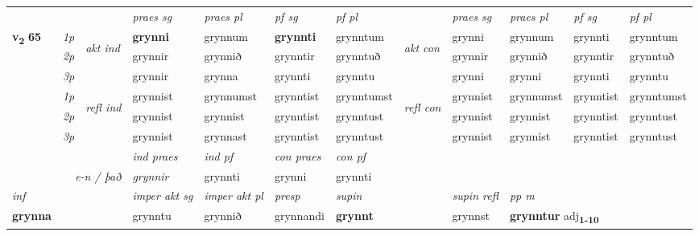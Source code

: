 \begin{longtable}[l]{X>{\footnotesize\itshape}llXXXXlXXXX}
 & &   & \textit{praes sg}  & \textit{praes pl}    & \textit{ pf sg} & \textit{pf pl} & & \textit{praes sg}  & \textit{praes pl}    & \textit{pf sg} & \textit{pf pl }  \\ \cmidrule{4-7} \cmidrule{9-12}
 \multirow{2}{*}{{{\textbf{v{\textsubscript{2}}} \Large{\textbf{65}}}}}  & 1p & \multirow{3}{*}{\begin{turn}{90}\textit{akt ind}\end{turn}} & \textbf{grynni} & grynnum & \textbf{grynnti} & grynntum & \multirow{3}{*}{\begin{turn}{90}\textit{akt con}\end{turn}} &grynni & grynnum & grynnti & grynntum\\*
 & 2p &  &  grynnir  & grynnið & grynntir & grynntuð & & grynnir & grynnið & grynntir & grynntuð \\*
 & 3p &  & grynnir & grynna & grynnti & grynntu & & grynni & grynni& grynnti & grynntu \\*
\cmidrule{4-7} \cmidrule{9-12}
 & 1p & \multirow{3}{*}{\begin{turn}{90}\textit{refl ind}\end{turn}}  & grynnist & grynnumst & grynntist & grynntumst & \multirow{3}{*}{\begin{turn}{90}\textit{refl con}\end{turn}}  &grynnist & grynnumst & grynntist & grynntumst \\*
 & 2p &  & grynnist & grynnist & grynntist & grynntust & &grynnist & grynnist & grynntist & grynntust \\*
 & 3p  & & grynnist & grynnast & grynntist & grynntust & & grynnist & grynnist& grynntist & grynntust \\*
\cmidrule{4-7} \cmidrule{9-12}

   && &  \textit{ind praes} & \textit{ind pf} & \textit{con praes} & \textit{con pf} \\*
\multicolumn{3}{r}{\textit{e-n / það}} & grynnir & grynnti & grynni & grynnti \\*

\cmidrule{4-7}
   {\textit{inf}} & &  & \textit{imper akt sg} & \textit{imper akt pl}   & \textit{presp} & \textit{supin} && \textit{supin refl} & \textit{pp m} \\*
  {\textbf{grynna}} & && grynntu  & grynnið   & grynnandi &  \textbf{grynnt} && grynnst & \multicolumn{2}{l}{\textbf{grynntur} adj\textbf{\textsubscript{1-10}}} \\*

\midrule


\end{longtable}
